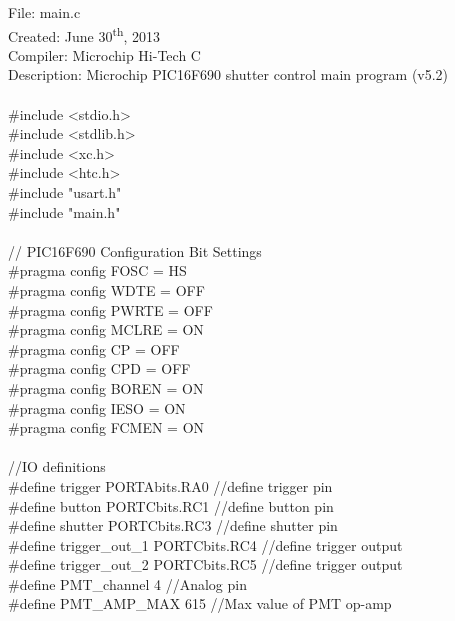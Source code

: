 \linespread{1.2}
\selectfont
\hspace*{-\parindent}
File: main.c\\
Created: June 30\textsuperscript{th}, 2013\\
Compiler: Microchip Hi\--Tech C\\
Description: Microchip PIC16F690 shutter control main program (v5.2)\\
\\
\#include <stdio.h>  \\
\#include <stdlib.h>\\
\#include <xc.h>\\
\#include <htc.h>\\
\#include "usart.h"\\
\#include "main.h"\\
\\
// PIC16F690 Configuration Bit Settings\\
\#pragma config FOSC = HS        \\
\#pragma config WDTE = OFF      \\ 
\#pragma config PWRTE = OFF      \\
\#pragma config MCLRE = ON      \\
\#pragma config CP = OFF        \\
\#pragma config CPD = OFF      \\
\#pragma config BOREN = ON      \\
\#pragma config IESO = ON       \\ 
\#pragma config FCMEN = ON      \\ 
\\
//IO definitions\\
\#define trigger PORTAbits.RA0  	\tabto*{7.5cm}//define trigger pin\\
\#define button PORTCbits.RC1		\tabto*{7.5cm}//define button pin\\
\#define shutter PORTCbits.RC3  	\tabto*{7.5cm}//define shutter pin\\
\#define trigger\_out\_1 PORTCbits.RC4		\tabto*{7.5cm}//define trigger output \\
\#define trigger\_out\_2 PORTCbits.RC5 		\tabto*{7.5cm}//define trigger output \\
\#define PMT\_channel 4 					\tabto*{7.5cm}//Analog pin\\
\#define PMT\_AMP\_MAX 615 				\tabto*{7.5cm}//Max value of PMT op\--amp\\
\\

